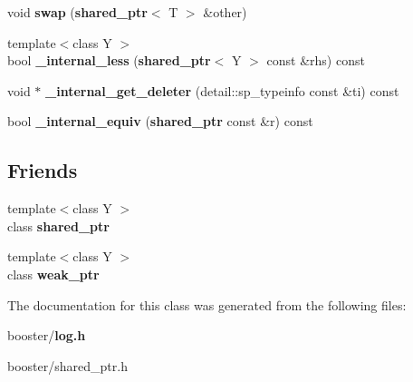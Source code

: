 \begin{DoxyCompactItemize}
\item 
void {\bfseries swap} ({\bf shared\-\_\-ptr}$<$ T $>$ \&other)\label{classbooster_1_1shared__ptr_af3cbdb878ddb9e4691bea4dfffb6ffd5}

\item 
{\footnotesize template$<$class Y $>$ }\\bool {\bfseries \-\_\-internal\-\_\-less} ({\bf shared\-\_\-ptr}$<$ Y $>$ const \&rhs) const \label{classbooster_1_1shared__ptr_a3b4f56f5e1c30ed8c2c7ff206b1ce3d2}

\item 
void $\ast$ {\bfseries \-\_\-internal\-\_\-get\-\_\-deleter} (detail\-::sp\-\_\-typeinfo const \&ti) const \label{classbooster_1_1shared__ptr_ae1f59324d5aae7890617e51ebdeee365}

\item 
bool {\bfseries \-\_\-internal\-\_\-equiv} ({\bf shared\-\_\-ptr} const \&r) const \label{classbooster_1_1shared__ptr_a7da6eb1a5ea8e47fcc091785c28cf3dc}

\end{DoxyCompactItemize}
\subsection*{Friends}
\begin{DoxyCompactItemize}
\item 
{\footnotesize template$<$class Y $>$ }\\class {\bfseries shared\-\_\-ptr}\label{classbooster_1_1shared__ptr_ab2104fa6e839672da3c30400e8325e52}

\item 
{\footnotesize template$<$class Y $>$ }\\class {\bfseries weak\-\_\-ptr}\label{classbooster_1_1shared__ptr_a27df6e2a1650d985bdeda33f0303c83f}

\end{DoxyCompactItemize}


The documentation for this class was generated from the following files\-:\begin{DoxyCompactItemize}
\item 
booster/{\bf log.\-h}\item 
booster/shared\-\_\-ptr.\-h\end{DoxyCompactItemize}

